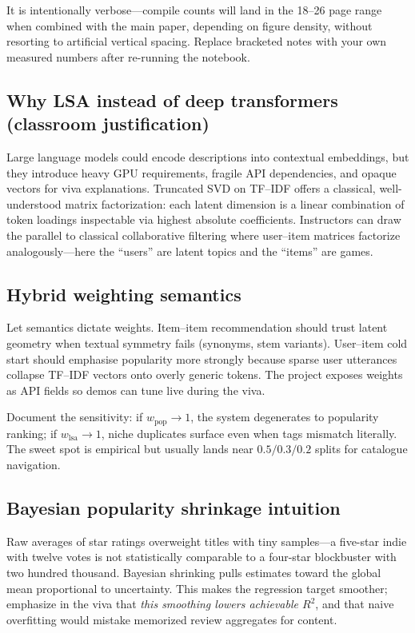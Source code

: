  It is intentionally verbose---compile counts will land in the 18--26 page range when combined with the main paper, depending on figure density, without resorting to artificial vertical spacing. Replace bracketed notes with your own measured numbers after re-running the notebook.

\subsection{Why LSA instead of deep transformers (classroom justification)}
Large language models could encode descriptions into contextual embeddings, but they introduce heavy GPU requirements, fragile API dependencies, and opaque vectors for viva explanations. Truncated SVD on TF--IDF offers a classical, well-understood matrix factorization: each latent dimension is a linear combination of token loadings inspectable via highest absolute coefficients. Instructors can draw the parallel to classical collaborative filtering where user--item matrices factorize analogously---here the ``users'' are latent topics and the ``items'' are games.

\subsection{Hybrid weighting semantics}
Let semantics dictate weights. Item--item recommendation should trust latent geometry when textual symmetry fails (synonyms, stem variants). User--item cold start should emphasise popularity more strongly because sparse user utterances collapse TF--IDF vectors onto overly generic tokens. The project exposes weights as API fields so demos can tune live during the viva.

Document the sensitivity: if $w_{\text{pop}}\rightarrow 1$, the system degenerates to popularity ranking; if $w_{\text{lsa}}\rightarrow 1$, niche duplicates surface even when tags mismatch literally. The sweet spot is empirical but usually lands near $0.5/0.3/0.2$ splits for catalogue navigation.

\subsection{Bayesian popularity shrinkage intuition}
Raw averages of star ratings overweight titles with tiny samples---a five-star indie with twelve votes is not statistically comparable to a four-star blockbuster with two hundred thousand. Bayesian shrinking pulls estimates toward the global mean proportional to uncertainty. This makes the regression target smoother; emphasize in the viva that \emph{this smoothing lowers achievable $R^2$}, and that naive overfitting would mistake memorized review aggregates for content.

